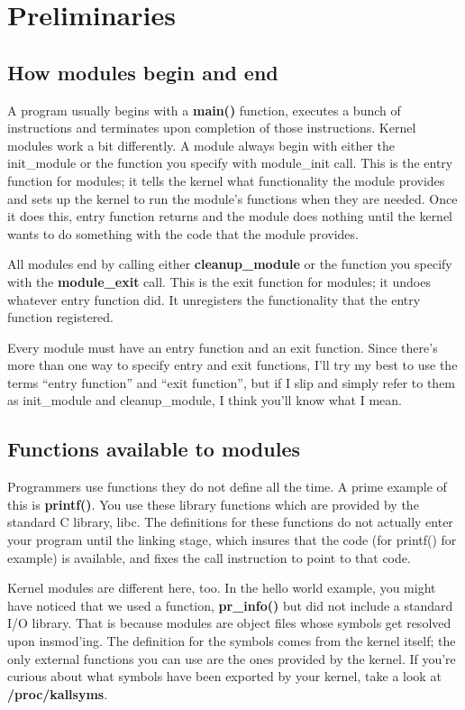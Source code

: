 \documentclass[10pt, oneside]{book}
\begin{document}
\section{Preliminaries}
\subsection{How modules begin and end}
\label{sec:module_init_exit}
A program usually begins with a \textbf{main()} function, executes a bunch of instructions and terminates upon completion of those instructions.
Kernel modules work a bit differently. A module always begin with either the init\_module or the function you specify with module\_init call.
This is the entry function for modules; it tells the kernel what functionality the module provides and sets up the kernel to run the module's functions when they are needed.
Once it does this, entry function returns and the module does nothing until the kernel wants to do something with the code that the module provides.

All modules end by calling either \textbf{cleanup\_module} or the function you specify with the \textbf{module\_exit} call.
This is the exit function for modules; it undoes whatever entry function did.
It unregisters the functionality that the entry function registered.

Every module must have an entry function and an exit function.
Since there's more than one way to specify entry and exit functions, I'll try my best to use the terms ``entry function'' and ``exit function'', but if I slip and simply refer to them as init\_module and cleanup\_module, I think you'll know what I mean.

\subsection{Functions available to modules}
\label{sec:avail_func}
Programmers use functions they do not define all the time. A prime example of this is \textbf{printf()}.
You use these library functions which are provided by the standard C library, libc.
The definitions for these functions do not actually enter your program until the linking stage, which insures that the code (for printf() for example) is available, and fixes the call instruction to point to that code.

Kernel modules are different here, too. In the hello world example, you might have noticed that we used a function, \textbf{pr\_info()} but did not include a standard I/O library.
That is because modules are object files whose symbols get resolved upon insmod'ing.
The definition for the symbols comes from the kernel itself; the only external functions you can use are the ones provided by the kernel.
If you're curious about what symbols have been exported by your kernel, take a look at \textbf{/proc/kallsyms}.
\end{document}
